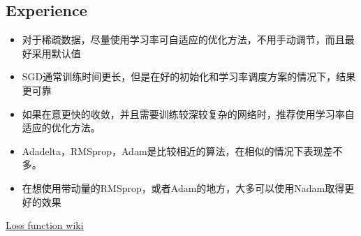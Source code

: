 \documentclass[hyperref, UTF-8]{ctexart}
\begin{document}
\subsection{Experience}
\begin{itemize}
\item 对于稀疏数据，尽量使用学习率可自适应的优化方法，不用手动调节，而且最好采用默认值
\item SGD通常训练时间更长，但是在好的初始化和学习率调度方案的情况下，结果更可靠
\item 如果在意更快的收敛，并且需要训练较深较复杂的网络时，推荐使用学习率自适应的优化方法。
\item Adadelta，RMSprop，Adam是比较相近的算法，在相似的情况下表现差不多。
\item 在想使用带动量的RMSprop，或者Adam的地方，大多可以使用Nadam取得更好的效果
\end{itemize}



\begin{thebibliography}{99}
 \href{https://en.wikipedia.org/wiki/Loss_function}{Loss function wiki}
\end{thebibliography}
\end{document}
